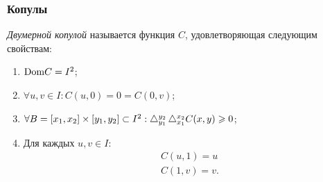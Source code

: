 \documentclass[11pt]{beamer}
\begin{document}
\begin{frame}
\frametitle{Копулы}
\emph{Двумерной копулой} называется функция $C$, удовлетворяющая следующим свойствам:
\begin{enumerate}
\item $\mathrm{Dom}{C} = I^2$;
\item $\forall u,v \in I : C(u, 0) = 0 = C(0, v)$;
\item $\forall B = [x_1, x_2] \times [y_1, y_2] \subset I^2 : \mathop{}\!\mathbin\bigtriangleup_{y_1}^{y_2}\mathop{}\!\mathbin\bigtriangleup_{x_1}^{x_2}C(x, y) \geqslant 0$;
\item Для каждых $u, v \in I$:
  \begin{gather}
    C(u, 1) = u \\
    C(1, v) = v.
  \end{gather}
\end{enumerate}
\end{frame}
\end{document}
